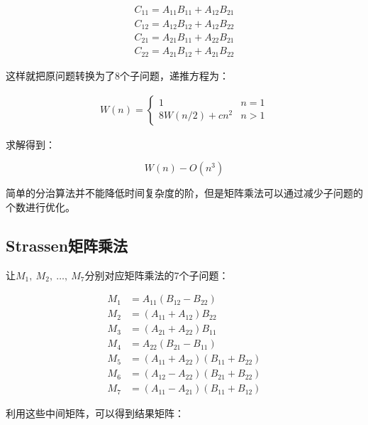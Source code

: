 \begin{align*}
	C_{11} = A_{11}B_{11} + A_{12}B_{21} \\
	C_{12} = A_{12}B_{12} + A_{12}B_{22} \\
	C_{21} = A_{21}B_{11} + A_{22}B_{21} \\
	C_{22} = A_{21}B_{12} + A_{21}B_{22}
\end{align*}

这样就把原问题转换为了8个子问题，递推方程为：

\vspace{-0.5cm}

\begin{align*}
	W(n) = \begin{cases}
		1              & n = 1 \\
		8W(n/2) + cn^2 & n > 1
	\end{cases}
\end{align*}

求解得到：

\vspace{-0.5cm}

$$
	W(n) - O(n^3)
$$

简单的分治算法并不能降低时间复杂度的阶，但是矩阵乘法可以通过减少子问题的个数进行优化。\\

\subsection{Strassen矩阵乘法}

让$  M_1,\ M_2,\ \dots,\ M_7 $分别对应矩阵乘法的7个子问题：

\vspace{-0.5cm}

\begin{align*}
	M_1 & = A_{11}(B_{12} - B_{22})            \\
	M_2 & = (A_{11} + A_{12})B_{22}            \\
	M_3 & = (A_{21} + A_{22})B_{11}            \\
	M_4 & = A_{22}(B_{21} - B_{11})            \\
	M_5 & = (A_{11} + A_{22})(B_{11} + B_{22}) \\
	M_6 & = (A_{12} - A_{22})(B_{21} + B_{22}) \\
	M_7 & = (A_{11} - A_{21})(B_{11} + B_{12})
\end{align*}

利用这些中间矩阵，可以得到结果矩阵：

\vspace{-1cm}

